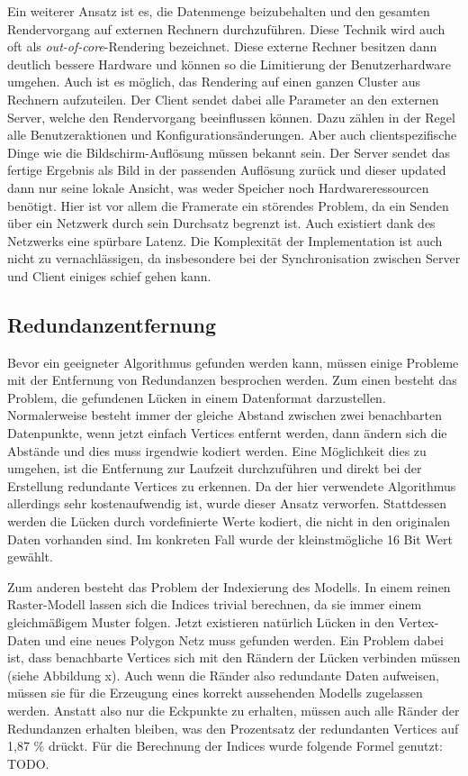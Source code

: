 Ein weiterer Ansatz ist es, die Datenmenge beizubehalten und den gesamten Rendervorgang auf externen Rechnern durchzuführen. Diese Technik wird auch oft als \textit{out-of-core}-Rendering bezeichnet\cite[Abschnitt 3]{outOfCore}. Diese externe Rechner besitzen dann deutlich bessere Hardware und können so die Limitierung der Benutzerhardware umgehen. Auch ist es möglich, das Rendering auf einen ganzen Cluster aus Rechnern aufzuteilen.  Der Client sendet dabei alle Parameter an den externen Server, welche den Rendervorgang beeinflussen können. Dazu zählen in der Regel alle Benutzeraktionen und Konfigurationsänderungen. Aber auch clientspezifische Dinge wie die Bildschirm-Auflösung müssen bekannt sein. Der Server sendet das fertige Ergebnis als Bild in der passenden Auflösung zurück und dieser updated dann nur seine lokale Ansicht, was weder Speicher noch Hardwareressourcen benötigt. Hier ist vor allem die Framerate ein störendes Problem, da ein Senden über ein Netzwerk durch sein Durchsatz begrenzt ist. Auch existiert dank des Netzwerks eine spürbare Latenz. Die Komplexität der Implementation ist auch nicht zu vernachlässigen, da insbesondere bei der Synchronisation zwischen Server und Client einiges schief gehen kann.

\subsection{Redundanzentfernung}\label{redundanzberechnung}
Bevor ein geeigneter Algorithmus gefunden werden kann, müssen einige Probleme mit der Entfernung von Redundanzen besprochen werden. Zum einen besteht das Problem, die gefundenen Lücken in einem Datenformat darzustellen. Normalerweise besteht immer der gleiche Abstand zwischen zwei benachbarten Datenpunkte, wenn jetzt einfach Vertices entfernt werden, dann ändern sich die Abstände und dies muss irgendwie kodiert werden. Eine Möglichkeit dies zu umgehen, ist die Entfernung zur Laufzeit durchzuführen und direkt bei der Erstellung redundante Vertices zu erkennen. Da der hier verwendete Algorithmus allerdings sehr kostenaufwendig ist, wurde dieser Ansatz verworfen. Stattdessen werden die Lücken durch vordefinierte Werte kodiert, die nicht in den originalen Daten vorhanden sind. Im konkreten Fall wurde der kleinstmögliche 16 Bit Wert gewählt.

Zum anderen besteht das Problem der Indexierung des Modells. In einem reinen Raster-Modell lassen sich die Indices trivial berechnen, da sie immer einem gleichmäßigem Muster folgen. Jetzt existieren natürlich Lücken in den Vertex-Daten und eine neues Polygon Netz muss gefunden werden. Ein Problem dabei ist, dass benachbarte Vertices sich mit den Rändern der Lücken verbinden müssen (siehe Abbildung x). Auch wenn die Ränder also redundante Daten aufweisen, müssen sie für die Erzeugung eines korrekt aussehenden Modells zugelassen werden. Anstatt also nur die Eckpunkte zu erhalten, müssen auch alle Ränder der Redundanzen erhalten bleiben, was den Prozentsatz der redundanten Vertices auf 1,87 \% drückt. Für die Berechnung der Indices wurde folgende Formel genutzt: TODO.

